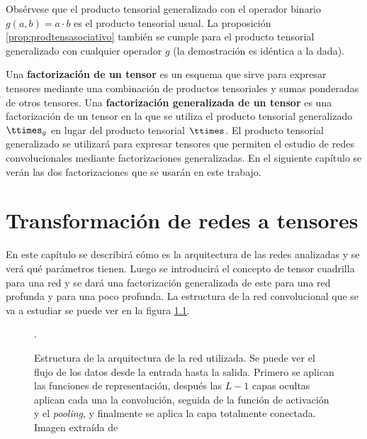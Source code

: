 Obsérvese que el producto tensorial generalizado con el operador binario $g(a,b) = a \cdot b$ es el producto tensorial usual. La proposición \ref{prop:prodtensasociativo} también se cumple para el producto tensorial generalizado con cualquier operador $g$ (la demostración es idéntica a la dada).

Una \textbf{factorización de un tensor} es un esquema que sirve para expresar tensores mediante una combinación de productos tensoriales y sumas ponderadas de otros tensores. Una \textbf{factorización generalizada de un tensor} es una factorización de un tensor en la que se utiliza el producto tensorial generalizado $\ttimes_g$ en lugar del producto tensorial $\ttimes$. El producto tensorial generalizado se utilizará para expresar tensores que permiten el estudio de redes convolucionales mediante factorizaciones generalizadas. En el siguiente capítulo se verán las dos factorizaciones que se usarán en este trabajo.


\newpage
\chapter{Transformación de redes a tensores}

En este capítulo se describirá cómo es la arquitectura de las redes analizadas y se verá qué parámetros tienen. Luego se introducirá el concepto de tensor cuadrilla para una red y se dará una factorización generalizada de este para una red profunda y para una poco profunda. La estructura de la red convolucional que se va a estudiar se puede ver en la figura \ref{fig:red_convolucional_estrucutra}. 


\begin{figure}[h]
\noindent
{}
\caption{Estructura de la arquitectura de la red utilizada. Se puede ver el flujo de los datos desde la entrada hasta la salida. Primero se aplican las funciones de representación, después las $L-1$ capas ocultas aplican cada una la convolución, seguida de la función de activación y el \textit{pooling}, y finalmente se aplica la capa totalmente conectada. Imagen extraída de \cite{DBLP:journals/corr/CohenS16}}.
\label{fig:red_convolucional_estrucutra}
\end{figure}

